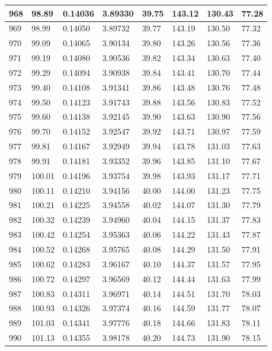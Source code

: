 \documentclass[12pt,a4paper,twoside]{article}
\begin{document}
\begin{center}
\begin{longtable}{l l l l | l l l l}
968 & 98.89 & 0.14036 & 3.89330 & 39.75 & 143.12 & 130.43 & 77.28 \\ \hline
969 & 98.99 & 0.14050 & 3.89732 & 39.77 & 143.19 & 130.50 & 77.32 \\ \hline
970 & 99.09 & 0.14065 & 3.90134 & 39.80 & 143.26 & 130.56 & 77.36 \\ \hline
971 & 99.19 & 0.14080 & 3.90536 & 39.82 & 143.34 & 130.63 & 77.40 \\ \hline
972 & 99.29 & 0.14094 & 3.90938 & 39.84 & 143.41 & 130.70 & 77.44 \\ \hline
973 & 99.40 & 0.14108 & 3.91341 & 39.86 & 143.48 & 130.76 & 77.48 \\ \hline
974 & 99.50 & 0.14123 & 3.91743 & 39.88 & 143.56 & 130.83 & 77.52 \\ \hline
975 & 99.60 & 0.14138 & 3.92145 & 39.90 & 143.63 & 130.90 & 77.56 \\ \hline
976 & 99.70 & 0.14152 & 3.92547 & 39.92 & 143.71 & 130.97 & 77.59 \\ \hline
977 & 99.81 & 0.14167 & 3.92949 & 39.94 & 143.78 & 131.03 & 77.63 \\ \hline
978 & 99.91 & 0.14181 & 3.93352 & 39.96 & 143.85 & 131.10 & 77.67 \\ \hline
979 & 100.01 & 0.14196 & 3.93754 & 39.98 & 143.93 & 131.17 & 77.71 \\ \hline
980 & 100.11 & 0.14210 & 3.94156 & 40.00 & 144.00 & 131.23 & 77.75 \\ \hline
981 & 100.21 & 0.14225 & 3.94558 & 40.02 & 144.07 & 131.30 & 77.79 \\ \hline
982 & 100.32 & 0.14239 & 3.94960 & 40.04 & 144.15 & 131.37 & 77.83 \\ \hline
983 & 100.42 & 0.14254 & 3.95363 & 40.06 & 144.22 & 131.43 & 77.87 \\ \hline
984 & 100.52 & 0.14268 & 3.95765 & 40.08 & 144.29 & 131.50 & 77.91 \\ \hline
985 & 100.62 & 0.14283 & 3.96167 & 40.10 & 144.37 & 131.57 & 77.95 \\ \hline
986 & 100.72 & 0.14297 & 3.96569 & 40.12 & 144.44 & 131.63 & 77.99 \\ \hline
987 & 100.83 & 0.14311 & 3.96971 & 40.14 & 144.51 & 131.70 & 78.03 \\ \hline
988 & 100.93 & 0.14326 & 3.97374 & 40.16 & 144.59 & 131.77 & 78.07 \\ \hline
989 & 101.03 & 0.14341 & 3.97776 & 40.18 & 144.66 & 131.83 & 78.11 \\ \hline
990 & 101.13 & 0.14355 & 3.98178 & 40.20 & 144.73 & 131.90 & 78.15 \\ \hline

\end{longtable}
\end{center}
\end{document}
